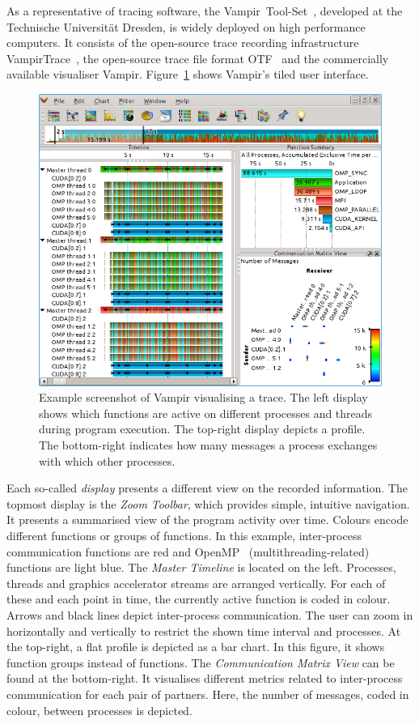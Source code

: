 \documentclass[a4paper, final, diplominf]{zih-template}
\begin{document}
As a representative of tracing software, the Vampir~Tool-Set~\cite{knuepfer08b}, developed at the Technische Universit\"at Dresden, is widely deployed on high performance computers.
It consists of the open-source trace recording infrastructure VampirTrace~\cite{vampirtrace}, the open-source trace file format OTF~\cite{knuepfer06} and the commercially available visualiser Vampir.
Figure~\ref{fig:vampir-example-screenshot} shows Vampir's tiled user interface.
\begin{figure}[tbh]
	\centering
	\includegraphics[width=13.08cm]{vampir-example-screenshot}
	\caption{Example screenshot of Vampir visualising a trace. The left display shows which functions are active on different processes and threads during program execution. The top-right display depicts a profile. The bottom-right indicates how many messages a process exchanges with which other processes.}
	\label{fig:vampir-example-screenshot}
\end{figure}
Each so-called \emph{display} presents a different view on the recorded information.
The topmost display is the \emph{Zoom Toolbar}, which provides simple, intuitive navigation.
It presents a summarised view of the program activity over time.
Colours encode different functions or groups of functions.
In this example, inter-process communication functions are red and OpenMP~\cite{openmp} (multithreading-related) functions are light blue.
The \emph{Master Timeline} is located on the left.
Processes, threads and graphics accelerator streams are arranged vertically.
For each of these and each point in time, the currently active function is coded in colour.
Arrows and black lines depict inter-process communication.
The user can zoom in horizontally and vertically to restrict the shown time interval and processes.
At the top-right, a flat profile is depicted as a bar chart.
In this figure, it shows function groups instead of functions.
The \emph{Communication Matrix View} can be found at the bottom-right.
It visualises different metrics related to inter-process communication for each pair of partners.
Here, the number of messages, coded in colour, between processes is depicted.
\end{document}
